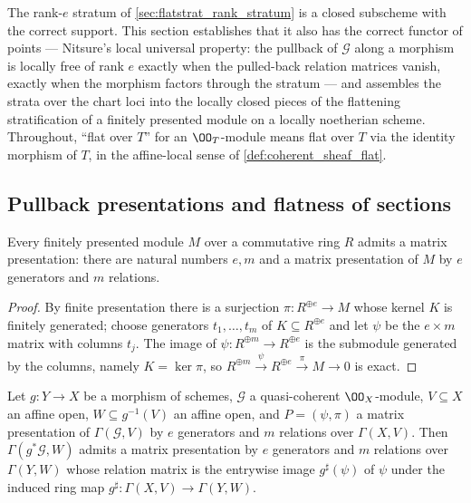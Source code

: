 The rank-\(e\) stratum of \cref{sec:flatstrat_rank_stratum} is a closed
subscheme with the correct support.  This section establishes that it also
has the correct functor of points --- Nitsure's local universal property:
the pullback of \(\mathcal G\) along a morphism is locally free of rank
\(e\) exactly when the pulled-back relation matrices vanish, exactly when
the morphism factors through the stratum --- and assembles the strata over
the chart loci into the locally closed pieces of the flattening
stratification of a finitely presented module on a locally noetherian
scheme.  Throughout, ``flat over \(T\)'' for an \(\OO_T\)-module means flat
over \(T\) via the identity morphism of \(T\), in the affine-local sense of
\cref{def:coherent_sheaf_flat}.

\subsection{Pullback presentations and flatness of sections}

\begin{lemma}
  \label{lem:exists_matrix_presentation}
  \leanok
  Every finitely presented module \(M\) over a commutative ring \(R\) admits
  a matrix presentation: there are natural numbers \(e, m\) and a matrix
  presentation of \(M\) by \(e\) generators and \(m\) relations.
\end{lemma}

\begin{proof}
  \leanok
  By finite presentation there is a surjection \(\pi : R^{\oplus e} \to M\)
  whose kernel \(K\) is finitely generated; choose generators
  \(t_1, \dots, t_m\) of \(K \subseteq R^{\oplus e}\) and let \(\psi\) be
  the \(e \times m\) matrix with columns \(t_j\).  The image of
  \(\psi : R^{\oplus m} \to R^{\oplus e}\) is the submodule generated by
  the columns, namely \(K = \ker \pi\), so
  \(R^{\oplus m} \xrightarrow{\psi} R^{\oplus e} \xrightarrow{\pi} M \to 0\)
  is exact.
\end{proof}

\begin{lemma}
  \label{lem:presentation_pullback_sections}
  \leanok
  Let \(g : Y \to X\) be a morphism of schemes, \(\mathcal G\) a
  quasi-coherent \(\OO_X\)-module, \(V \subseteq X\) an affine open,
  \(W \subseteq g^{-1}(V)\) an affine open, and \(P = (\psi, \pi)\) a matrix
  presentation of \(\Gamma(\mathcal G, V)\) by \(e\) generators and \(m\)
  relations over \(\Gamma(X, V)\).  Then \(\Gamma(g^*\mathcal G, W)\) admits
  a matrix presentation by \(e\) generators and \(m\) relations over
  \(\Gamma(Y, W)\) whose relation matrix is the entrywise image
  \(g^\sharp(\psi)\) of \(\psi\) under the induced ring map
  \(g^\sharp : \Gamma(X, V) \to \Gamma(Y, W)\).
\end{lemma}

